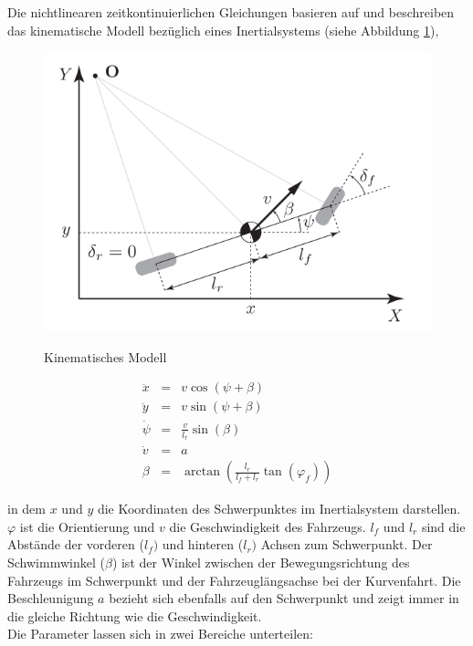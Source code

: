 \documentclass{like}
\begin{document}
Die nichtlinearen zeitkontinuierlichen Gleichungen basieren auf \cite{rajamani2011vehicle, 7225830} und beschreiben das kinematische Modell bezüglich eines Inertialsystems (siehe Abbildung \ref{fig:kinmodel}),

\begin{figure}[ht!]
	\caption{Kinematisches Modell}
	\includegraphics[width=400pt]{Abbildungen/kin_bicycle.png}
	\label{fig:kinmodel}
\end{figure}

\begin{eqnarray}
\ddot{x}   &= &v  \cos(\psi + \beta)\\
\ddot{y}   &= &v  \sin(\psi + \beta)\\
\dot{\psi} &= &\frac{v}{l_r} \sin(\beta) \\
\dot{v}    &= &a \\
\beta      &= &\arctan(\frac{l_r}{l_f + l_r} \tan(\varphi_f))
\end{eqnarray}

in dem \(x\) und \(y\) die Koordinaten des Schwerpunktes im Inertialsystem darstellen. 
\(\varphi\) ist die Orientierung und \(v\) die Geschwindigkeit des Fahrzeugs. \(l_f\) und \(l_r\) sind die Abstände der vorderen (\(l_f)\) und hinteren (\(l_r)\) Achsen zum Schwerpunkt.
Der Schwimmwinkel (\(\beta\)) ist der Winkel  zwischen der Bewegungsrichtung des Fahrzeugs im Schwerpunkt und der Fahrzeuglängsachse bei der Kurvenfahrt. Die Beschleunigung \(a\) bezieht sich ebenfalls auf den Schwerpunkt und zeigt immer in die gleiche Richtung wie die Geschwindigkeit. \\
Die Parameter lassen sich in zwei Bereiche unterteilen:
\end{document}
